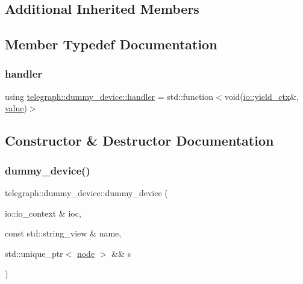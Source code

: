 \subsection*{Additional Inherited Members}


\subsection{Member Typedef Documentation}
\mbox{\label{classtelegraph_1_1dummy__device_a608031386eb0abf2fc578211c1270f89}} 
\subsubsection{\texorpdfstring{handler}{handler}}
{\footnotesize\ttfamily using \hyperlink{classtelegraph_1_1dummy__device_a608031386eb0abf2fc578211c1270f89}{telegraph\+::dummy\+\_\+device\+::handler} =  std\+::function$<$void(\hyperlink{structboost_1_1asio_1_1yield__ctx}{io\+::yield\+\_\+ctx}\&, \hyperlink{classtelegraph_1_1value}{value})$>$}



\subsection{Constructor \& Destructor Documentation}
\mbox{\label{classtelegraph_1_1dummy__device_a70f00acd6141dea4c68f3b1f51c06cf0}} 
\subsubsection{\texorpdfstring{dummy\+\_\+device()}{dummy\_device()}}
{\footnotesize\ttfamily telegraph\+::dummy\+\_\+device\+::dummy\+\_\+device (\begin{DoxyParamCaption}\item[{io\+::io\+\_\+context \&}]{ioc,  }\item[{const std\+::string\+\_\+view \&}]{name,  }\item[{std\+::unique\+\_\+ptr$<$ \hyperlink{classtelegraph_1_1node}{node} $>$ \&\&}]{s }\end{DoxyParamCaption})}

